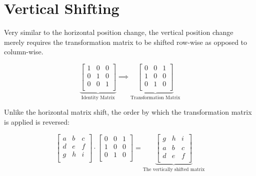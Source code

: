 \section{Vertical Shifting}

Very similar to the horizontal position change, the vertical position change merely requires the transformation matrix to be shifted row-wise as opposed to column-wise.

    \[
      \underbrace{
        \begin{bmatrix}
          1&0&0\\
          0&1&0\\
          0&0&1\\
        \end{bmatrix}
      }_{\text{Identity Matrix}}
      \implies
      \underbrace{
        \begin{bmatrix}
          0&0&1\\
          1&0&0\\
          0&1&0\\
        \end{bmatrix}
      }_{\text{Transformation Matrix}}
    \]

Unlike the horizontal matrix shift, the order by which the transformation matrix is applied is reversed:

    \[
      \begin{bmatrix}
        a&b&c\\
        d&e&f\\
        g&h&i\\
      \end{bmatrix}
      \cdot
      \begin{bmatrix}
        0&0&1\\
        1&0&0\\
        0&1&0\\
      \end{bmatrix}
      =
      \underbrace{
        \begin{bmatrix}
        g&h&i\\
        a&b&c\\
        d&e&f\\
        \end{bmatrix}
      }_{\text{The vertically shifted matrix}}
    \]

